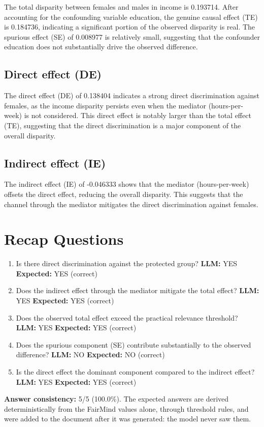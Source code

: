 \documentclass[11pt]{article}
\begin{document}
The total disparity between females and males in income is 0.193714. After accounting for the confounding variable education, the genuine causal effect (TE) is 0.184736, indicating a significant portion of the observed disparity is real. The spurious effect (SE) of 0.008977 is relatively small, suggesting that the confounder education does not substantially drive the observed difference.

\subsection{Direct effect (DE)}

The direct effect (DE) of 0.138404 indicates a strong direct discrimination against females, as the income disparity persists even when the mediator (hours-per-week) is not considered. This direct effect is notably larger than the total effect (TE), suggesting that the direct discrimination is a major component of the overall disparity.

\subsection{Indirect effect (IE)}

The indirect effect (IE) of -0.046333 shows that the mediator (hours-per-week) offsets the direct effect, reducing the overall disparity. This suggests that the channel through the mediator mitigates the direct discrimination against females.

\section{Recap Questions}

\begin{enumerate}
\item Is there direct discrimination against the protected group? \textbf{LLM:} YES \quad \textbf{Expected:} YES \quad (correct)
\item Does the indirect effect through the mediator mitigate the total effect? \textbf{LLM:} YES \quad \textbf{Expected:} YES \quad (correct)
\item Does the observed total effect exceed the practical relevance threshold? \textbf{LLM:} YES \quad \textbf{Expected:} YES \quad (correct)
\item Does the spurious component (SE) contribute substantially to the observed difference? \textbf{LLM:} NO \quad \textbf{Expected:} NO \quad (correct)
\item Is the direct effect the dominant component compared to the indirect effect? \textbf{LLM:} YES \quad \textbf{Expected:} YES \quad (correct)
\end{enumerate}


\vspace{1em}
\noindent\textbf{Answer consistency:} 5/5 (100.0\%). The expected answers are derived deterministically from the FairMind values alone, through threshold rules, and were added to the document after it was generated: the model never saw them.
\end{document}
